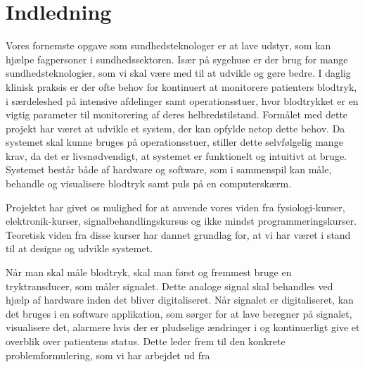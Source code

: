 \chapter{Indledning}
Vores fornemste opgave som sundhedsteknologer er at lave udstyr, som kan hjælpe fagpersoner i sundhedssektoren. Især på sygehuse er der brug for mange sundhedsteknologier, som vi skal være med til at udvikle og gøre bedre. I daglig klinisk praksis er der ofte behov for kontinuert at monitorere patienters blodtryk, i særdeleshed på intensive afdelinger samt operationsstuer, hvor blodtrykket er en vigtig parameter til monitorering af deres helbredstilstand. Formålet med dette projekt har været at udvikle et system, der kan opfylde netop dette behov. Da systemet skal kunne bruges på operationsstuer, stiller dette selvfølgelig mange krav, da det er livsnødvendigt, at systemet er funktionelt og intuitivt at bruge. Systemet består både af hardware og software, som i sammenspil kan måle, behandle og visualisere blodtryk samt puls på en computerskærm. 

Projektet har givet os mulighed for at anvende vores viden fra fysiologi-kurser, elektronik-kurser, signalbehandlingskursus og ikke mindst programmeringskurser. Teoretisk viden fra disse kurser har dannet grundlag for, at vi har været i stand til at designe og udvikle systemet.
 
Når man skal måle blodtryk, skal man først og fremmest bruge en tryktransducer, som måler signalet. Dette analoge signal skal behandles ved hjælp af hardware inden det bliver digitaliseret. Når signalet er digitaliseret, kan det bruges i en software applikation, som sørger for at lave beregner på signalet, visualisere det, alarmere hvis der er pludselige ændringer i og kontinuerligt give et overblik over patientens status. Dette leder frem til den konkrete problemformulering, som vi har arbejdet ud fra



